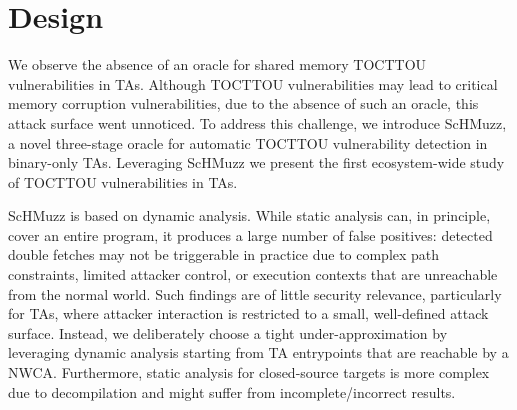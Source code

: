 \documentclass[conference]{IEEEtran}
\newcommand{\sysname}{ScHMuzz\xspace}
\begin{document}
\section{Design}\label{sec:design} 



We observe the absence of an oracle for shared memory TOCTTOU vulnerabilities in TAs.
Although TOCTTOU vulnerabilities may lead to critical memory corruption vulnerabilities, due to the 
absence of such an oracle, this attack surface went unnoticed.
To address this challenge, we introduce \sysname, a novel three-stage oracle  
for automatic TOCTTOU vulnerability detection in binary-only TAs. 
Leveraging \sysname we present the first ecosystem-wide study of TOCTTOU vulnerabilities in TAs.

\sysname is based on dynamic analysis. While static analysis 
can, in principle, cover an entire program, it produces a large number of false positives: detected double fetches 
may not be triggerable in practice due to complex path constraints, limited attacker control, or execution 
contexts that are unreachable from the normal world. Such findings are of little security relevance, 
particularly for TAs, where attacker interaction is restricted to a small, well-defined attack surface.
Instead, we deliberately choose a tight under-approximation by leveraging dynamic analysis starting from 
TA entrypoints that are reachable by a NWCA. Furthermore, static analysis for closed-source targets is more 
complex due to decompilation and might suffer from incomplete/incorrect results.
\end{document}
